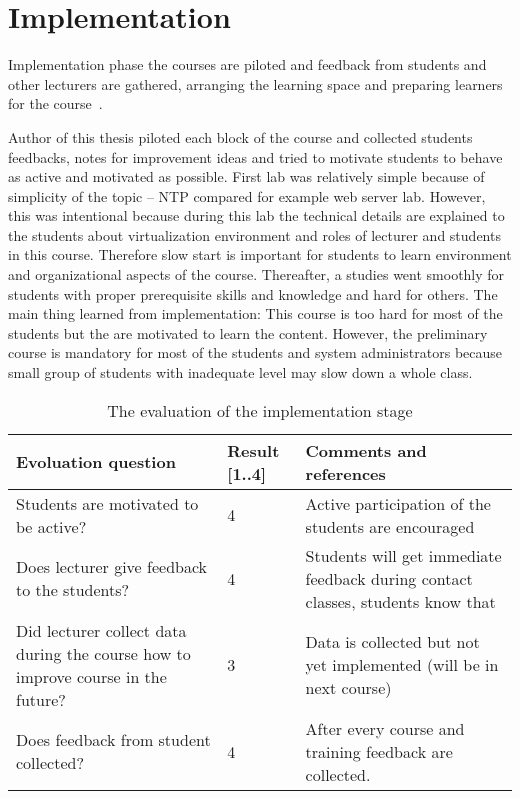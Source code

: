 \section{Implementation}

Implementation phase the courses are piloted and feedback from students and other lecturers are gathered, arranging the learning space  and preparing learners for the course~\citep{OppeArenduskeskus2010}.

Author of this thesis piloted each block of the course and collected students feedbacks, notes for improvement ideas and tried to motivate students to behave as active and motivated as possible.
First lab was relatively simple because of simplicity of the topic -- \gls{NTP} compared for example web server lab. However, this was intentional because during this lab the technical details are explained to the students about virtualization environment and roles of lecturer and students in this course. Therefore slow start is important for students to learn environment and organizational aspects of the course. Thereafter, a studies went smoothly for students with proper prerequisite skills and knowledge and hard for others. The main thing learned from implementation: This course is too hard for most of the students but the are motivated to learn the content. However, the preliminary course is mandatory for most of the students and system administrators because small group of students with inadequate level may slow down a whole class.

\begin{table}[h]
\centering
\caption{The evaluation of the implementation stage }
{ \small 
\begin{tabular}{|p{6cm}|p{2cm}|p{5cm}|}
\hline 
\color{blue} Evoluation question & \color{blue} Result [1..4] & \color{blue} Comments and references \\ 
\hline
Students are motivated to be active? 
& 4  &  Active participation of the students are encouraged \\ 
\hline 
Does lecturer give feedback to the students?
& 4 &  Students will get immediate feedback during contact classes, students know that \\ 
\hline 
Did lecturer collect data during the course how to improve course in the future?
& 3 & Data is collected but not yet implemented (will be in next course) \\ 
\hline
Does feedback from student collected?
& 4 & After every course and training feedback are collected. \\ 
\hline 
\end{tabular} 
}
\label{table:implementation_evaluation}
\end{table}

